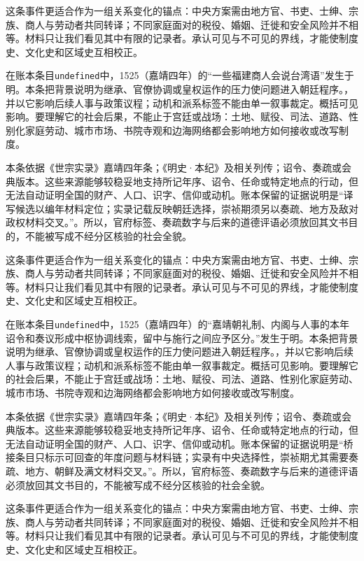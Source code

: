 这条事件更适合作为一组关系变化的锚点：中央方案需由地方官、书吏、士绅、宗族、商人与劳动者共同转译；不同家庭面对的税役、婚姻、迁徙和安全风险并不相等。材料只让我们看见其中有限的记录者。承认可见与不可见的界线，才能使制度史、文化史和区域史互相校正。

在账本条目\texttt{undefined}中，1525（嘉靖四年）的“一些福建商人会说台湾语”发生于明。本条把背景说明为继承、官僚协调或皇权运作的压力使问题进入朝廷程序。，并以它影响后续人事与政策议程；动机和派系标签不能由单一叙事裁定。概括可见影响。要理解它的社会后果，不能止于宫廷或战场：土地、赋役、司法、道路、性别化家庭劳动、城市市场、书院寺观和边海网络都会影响地方如何接收或改写制度。

本条依据《世宗实录》嘉靖四年条；《明史·本纪》及相关列传；诏令、奏疏或会典版本。这些来源能够较稳妥地支持所记年序、诏令、任命或特定地点的行动，但无法自动证明全国的财产、人口、识字、信仰或动机。账本保留的证据说明是“译写候选以编年材料定位；实录记载反映朝廷选择，崇祯期须另以奏疏、地方及敌对政权材料交叉。”。所以，官府标签、奏疏数字与后来的道德评语必须放回其文书目的，不能被写成不经分区核验的社会全貌。

这条事件更适合作为一组关系变化的锚点：中央方案需由地方官、书吏、士绅、宗族、商人与劳动者共同转译；不同家庭面对的税役、婚姻、迁徙和安全风险并不相等。材料只让我们看见其中有限的记录者。承认可见与不可见的界线，才能使制度史、文化史和区域史互相校正。

在账本条目\texttt{undefined}中，1525（嘉靖四年）的“嘉靖朝礼制、内阁与人事的本年诏令和奏议形成中枢协调线索，留中与施行之间应予区分。”发生于明。本条把背景说明为继承、官僚协调或皇权运作的压力使问题进入朝廷程序。，并以它影响后续人事与政策议程；动机和派系标签不能由单一叙事裁定。概括可见影响。要理解它的社会后果，不能止于宫廷或战场：土地、赋役、司法、道路、性别化家庭劳动、城市市场、书院寺观和边海网络都会影响地方如何接收或改写制度。

本条依据《世宗实录》嘉靖四年条；《明史·本纪》及相关列传；诏令、奏疏或会典版本。这些来源能够较稳妥地支持所记年序、诏令、任命或特定地点的行动，但无法自动证明全国的财产、人口、识字、信仰或动机。账本保留的证据说明是“桥接条目只标示可回查的年度问题与材料链；实录有中央选择性，崇祯期尤其需要奏疏、地方、朝鲜及满文材料交叉。”。所以，官府标签、奏疏数字与后来的道德评语必须放回其文书目的，不能被写成不经分区核验的社会全貌。

这条事件更适合作为一组关系变化的锚点：中央方案需由地方官、书吏、士绅、宗族、商人与劳动者共同转译；不同家庭面对的税役、婚姻、迁徙和安全风险并不相等。材料只让我们看见其中有限的记录者。承认可见与不可见的界线，才能使制度史、文化史和区域史互相校正。

